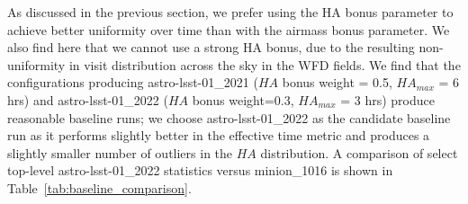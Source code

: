 \documentclass[DM,lsstdraft,authoryear,toc]{lsstdoc}
\begin{document}
As discussed in the previous section, we prefer using the HA bonus parameter to achieve better uniformity over time than with the airmass bonus parameter. We also find here that we cannot use a strong HA bonus, due to the resulting non-uniformity in visit distribution across the sky in the WFD fields. We find that the configurations producing astro-lsst-01\_2021 ($HA$ bonus weight = 0.5, $HA_{max}$  = 6 hrs) and astro-lsst-01\_2022 ($HA$ bonus weight=0.3, $HA_{max}$ = 3 hrs) produce reasonable baseline runs; we choose astro-lsst-01\_2022 as the candidate baseline run as it performs slightly better in the effective time metric and produces a slightly smaller number of outliers in the $HA$ distribution.  A comparison of select top-level astro-lsst-01\_2022 statistics versus minion\_1016 is shown in Table~\ref{tab:baseline_comparison}.
\end{document}
